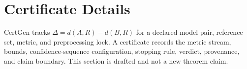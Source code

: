 \section{Certificate Details}

CertGen tracks $\Delta=d(A,R)-d(B,R)$ for a declared model pair, reference set, metric, and preprocessing lock. A certificate records the metric stream, bounds, confidence-sequence configuration, stopping rule, verdict, provenance, and claim boundary. This section is drafted and not a new theorem claim.
